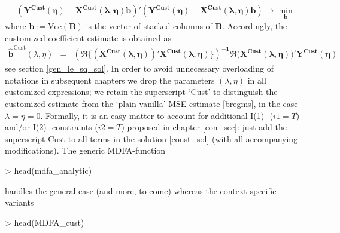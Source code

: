 \documentclass[a4paper]{book}
\begin{document}
\begin{eqnarray}\label{regcust}
(\mathbf{Y^{\textrm{Cust}}(\eta)-\mathbf{X}^{\textrm{Cust}}(\lambda,\eta)b})'(\mathbf{Y^{\textrm{Cust}}(\eta)-\mathbf{X}^{\textrm{Cust}}(\lambda,\eta)b})\to\min_{\mathbf{b}}
\end{eqnarray}
where $\mathbf{b}:=\textrm{Vec}(\mathbf{B})$ is the vector of stacked columns of $\mathbf{B}$. Accordingly, the customized coefficient estimate is obtained as 
\begin{eqnarray}\label{bregcust}
\mathbf{\hat{b}}^{\textrm{Cust}}(\lambda,\eta)&=&\mathbf{\left(\Re\Bigg\{(\mathbf{X}^{\textrm{Cust}}(\lambda,\eta))' \mathbf{X}^{\textrm{Cust}}(\lambda,\eta)\Bigg\}\right)^{-1}\Re(\mathbf{X}^{\textrm{Cust}}(\lambda,\eta)})'
\mathbf{Y^{\textrm{Cust}}(\eta)}
\end{eqnarray}
see section \ref{gen_le_sq_sol}. In order to avoid unnecessary overloading of notations in subsequent chapters we drop the parameters $(\lambda,\eta)$ in all customized expressions; we retain the superscript `Cust' to distinguish the customized estimate from the `plain vanilla' MSE-estimate \ref{bregms}, in the case $\lambda=\eta=0$.  Formally, it is an easy matter to account for additional I(1)- ($i1=T$) and/or I(2)- constraints ($i2=T$) proposed in chapter \ref{con_sec}: just add the superscript $\textrm{Cust}$ to all terms in the solution \ref{const_sol} (with all accompanying modifications). The generic MDFA-function 
\begin{Schunk}
\begin{Sinput}
> head(mdfa_analytic)
\end{Sinput}
\begin{Soutput}
1 function (L, lambda, weight_func, Lag, Gamma, eta, cutoff, i1,             
2     i2, weight_constraint, lambda_cross, lambda_decay, lambda_smooth,      
3     lin_eta, shift_constraint, grand_mean, b0_H0, c_eta, weight_structure, 
4     white_noise, synchronicity, lag_mat, troikaner)                        
5 {                                                                          
6     lambda <- abs(lambda)                                                  
\end{Soutput}
\end{Schunk}
handles the general case (and more, to come) whereas the context-specific variants
\begin{Schunk}
\begin{Sinput}
> head(MDFA_cust)
\end{Sinput}
\begin{Soutput}
1 function (L, weight_func, Lag, Gamma, cutoff, lambda, eta)                  
2 {                                                                           
3     lin_eta <- F                                                            
4     weight_constraint <- rep(1/(ncol(weight_func) - 1), ncol(weight_func) - 
5         1)                                                                  
6     lambda_cross <- lambda_smooth <- 0                                      
\end{Soutput}
\end{Schunk}
\end{document}
